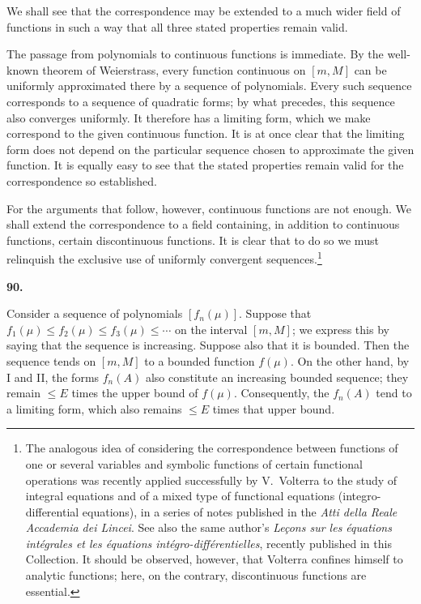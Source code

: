 \documentclass[
  paper=b5,
  fontsize=13pt,
  twoside=true,
  open=any,
  bookmarkpackage=false,
  chapterprefix=true,
  headings=normal
]{scrbook}
\theoremstyle{definition}
\newcommand{\numberedparagraph}[1]{%
  \par\medskip\phantomsection\label{sec:#1}%
  \noindent\textbf{#1.}\enspace
}
\begin{document}
We shall see that the correspondence may be extended to a much wider field of
functions in such a way that all three stated properties remain valid.

The passage from polynomials to continuous functions is immediate.  By the
well-known theorem of Weierstrass, every function continuous on \([m,M]\) can be
uniformly approximated there by a sequence of polynomials.  Every such sequence
corresponds to a sequence of quadratic forms; by what precedes, this sequence
also converges uniformly.  It therefore has a limiting form, which we make
correspond to the given continuous function.  It is at once clear that the
limiting form does not depend on the particular sequence chosen to approximate
the given function.  It is equally easy to see that the stated properties remain
valid for the correspondence so established.

For the arguments that follow, however, continuous functions are not enough.
We shall extend the correspondence to a field containing, in addition to
continuous functions, certain discontinuous functions.  It is clear that to do
so we must relinquish the exclusive use of uniformly convergent
sequences.\footnote{The analogous idea of considering the correspondence between
functions of one or several variables and symbolic functions of certain
functional operations was recently applied successfully by V.~Volterra to the
study of integral equations and of a mixed type of functional equations
(integro-differential equations), in a series of notes published in the
\emph{Atti della Reale Accademia dei Lincei}.  See also the same author's
\emph{Leçons sur les équations intégrales et les équations
intégro-différentielles}, recently published in this Collection.  It should be
observed, however, that Volterra confines himself to analytic functions; here,
on the contrary, discontinuous functions are essential.}

\numberedparagraph{90}
Consider a sequence of polynomials \([f_n(\mu)]\).  Suppose that
\(f_1(\mu)\le f_2(\mu)\le f_3(\mu)\le\cdots\) on the interval \([m,M]\); we
express this by saying that the sequence is increasing.  Suppose also that it is
bounded.  Then the sequence tends
on \([m,M]\) to a bounded function \(f(\mu)\).  On the other hand, by I and II,
the forms \(f_n(A)\) also constitute an increasing bounded sequence; they remain
\(\le E\) times the upper bound of \(f(\mu)\).  Consequently, the \(f_n(A)\)
tend to a limiting form, which also remains \(\le E\) times that upper bound.
\end{document}
